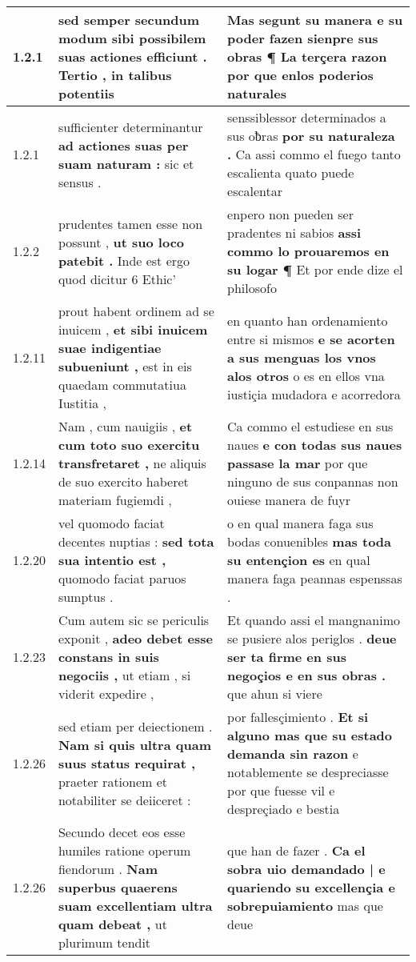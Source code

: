 \begin{tabular}{|p{1cm}|p{6.5cm}|p{6.5cm}|}
1.2.1 & sed semper secundum modum sibi possibilem \textbf{ suas actiones efficiunt . } Tertio , in talibus potentiis & Mas segunt su manera \textbf{ e su poder fazen sienpre sus obras ¶ } La terçera razon por que enlos poderios naturales \\\hline
1.2.1 & sufficienter determinantur \textbf{ ad actiones suas per suam naturam : } sic et sensus . & senssiblessor determinados a sus oƀras \textbf{ por su naturaleza . } Ca assi commo el fuego tanto escalienta quato puede escalentar \\\hline
1.2.2 & prudentes tamen esse non possunt , \textbf{ ut suo loco patebit . } Inde est ergo quod dicitur 6 Ethic’ & enpero non pueden ser pradentes ni sabios \textbf{ assi commo lo prouaremos en su logar ¶ } Et por ende dize el philosofo \\\hline
1.2.11 & prout habent ordinem ad se inuicem , \textbf{ et sibi inuicem suae indigentiae subueniunt , } est in eis quaedam commutatiua Iustitia , & en quanto han ordenamiento entre si mismos \textbf{ e se acorten a sus menguas los vnos alos otros } o es en ellos vna iustiçia mudadora e acorredora \\\hline
1.2.14 & Nam , cum nauigiis , \textbf{ et cum toto suo exercitu transfretaret , } ne aliquis de suo exercito haberet materiam fugiemdi , & Ca commo el estudiese en sus naues \textbf{ e con todas sus naues passase la mar } por que ninguno de sus conpannas non ouiese manera de fuyr \\\hline
1.2.20 & vel quomodo faciat decentes nuptias : \textbf{ sed tota sua intentio est , } quomodo faciat paruos sumptus . & o en qual manera faga sus bodas conuenibles \textbf{ mas toda su entençion es } en qual manera faga peannas espenssas . \\\hline
1.2.23 & Cum autem sic se periculis exponit , \textbf{ adeo debet esse constans in suis negociis , } ut etiam , si viderit expedire , & Et quando assi el mangnanimo se pusiere alos periglos . \textbf{ deue ser ta firme en sus negoçios e en sus obras . } que ahun si viere \\\hline
1.2.26 & sed etiam per deiectionem . \textbf{ Nam si quis ultra quam suus status requirat , } praeter rationem et notabiliter se deiiceret : & por fallesçimiento . \textbf{ Et si alguno mas que su estado demanda sin razon } e notablemente se despreciasse por que fuesse vil e despreçiado e bestia \\\hline
1.2.26 & Secundo decet eos esse humiles ratione operum fiendorum . \textbf{ Nam superbus quaerens suam excellentiam ultra quam debeat , } ut plurimum tendit & que han de fazer . \textbf{ Ca el sobra uio demandado | e quariendo su excellençia e sobrepuiamiento } mas que deue \\\hline

\end{tabular}

